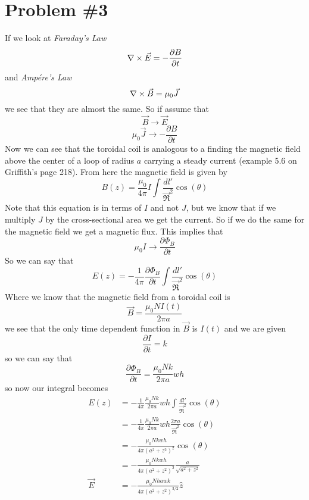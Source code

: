 \documentclass[11pt]{article}
\numberwithin{equation}{section}
\newcommand{\grad}{\bold\nabla}
\newcommand{\scrptR}{\vec{\mathfrak{R}}}
\begin{document}
\section{Problem \#3}
If we look at \emph{Faraday's Law}
\begin{equation}
\grad\times\vec{E} = -\frac{\partial B}{\partial t}
\label{Faraday}
\end{equation}
and \emph{Amp\'{e}re's Law}
\begin{equation}
\grad\times\vec{B} = \mu_0\vec{J}
\label{Faraday}
\end{equation}
we see that they are almost the same. So if assume that
$$\vec{B} \rightarrow \vec{E}$$
$$\mu_0\vec{J}\rightarrow-\frac{\partial B}{\partial t}$$
Now we can see that the toroidal coil is analogous to a finding the magnetic field above the center of a loop of radius $a$ carrying a steady current (example 5.6 on Griffith's page 218). From here the magnetic field is given by
$$B(z) = \frac{\mu_0}{4\pi}I\int\frac{dl'}{\scrptR^2}\cos(\theta)$$
Note that this equation is in terms of $I$ and not $J$, but we know that if we multiply $J$ by the cross-sectional area we get the current. So if we do the same for the magnetic field we get a magnetic flux. This implies that
$$\mu_0I\rightarrow\frac{\partial \Phi_B}{\partial t}$$
So we can say that
$$E(z) = -\frac{1}{4\pi}\frac{\partial \Phi_B}{\partial t}\int\frac{dl'}{\scrptR^2}\cos(\theta)$$
Where we know that the magnetic field from a toroidal coil is
$$\vec{B} = \frac{\mu_0NI(t)}{2\pi a}$$
we see that the only time dependent function in $\vec{B}$ is $I(t)$ and we are given 
$$\frac{\partial I}{\partial t} = k$$
so we can say that
$$\frac{\partial \Phi_B}{\partial t} = \frac{\mu_0Nk}{2\pi a}wh$$
so now our integral becomes
\begin{align*}
E(z) &= -\frac{1}{4\pi}\frac{\mu_0Nk}{2\pi a}wh\int\frac{dl'}{\scrptR^2}\cos(\theta)\\
&= -\frac{1}{4\pi}\frac{\mu_0Nk}{2\pi a}wh\frac{2\pi a}{\scrptR^2}\cos(\theta)\\
&= -\frac{\mu_0Nkwh}{4\pi(a^2+z^2)^2}\cos(\theta)\\
&= -\frac{\mu_0Nkwh}{4\pi(a^2+z^2)^2}\frac{a}{\sqrt{a^2+z^2}}\\
\vec{E} &= -\frac{\mu_0Nhawk}{4\pi(a^2+z^2)^{3/2}}\hat{z}
\end{align*}
\end{document}
